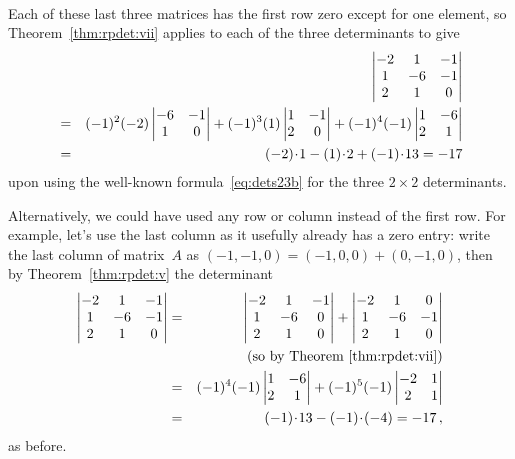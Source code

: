 \begin{example}
\begin{solution}
\begin{eqnarray*}
\end{eqnarray*}
Each of these last three matrices has the first row zero except for one element, so Theorem~\ref{thm:rpdet:vii} applies to each of the three determinants to give
\begin{eqnarray*}&&\hspace{-1em}
\begin{vmatrix}   -2&1&-1
\\   1 & -6 & -1
\\   2 &  1 & 0
\end{vmatrix}
\\&=&(-1)^2(-2)\begin{vmatrix}    -6 & -1
\\  1 & 0
\end{vmatrix}
+(-1)^3(1)\begin{vmatrix}    1 &  -1
\\   2 &  0
\end{vmatrix}
+(-1)^4(-1)\begin{vmatrix}   1 & -6 
\\   2 &  1 
\end{vmatrix}
\\&=&(-2)\cdot1-(1)\cdot2+(-1)\cdot13=-17
\end{eqnarray*}
upon using the well-known formula~\eqref{eq:dets23b} for the three \(2\times 2\) determinants.

Alternatively, we could have used any row or column instead of the first row.  
For example, let's use the last column as it usefully already has a zero entry: write the last column of matrix~\(A\) as \((-1,-1,0)=(-1,0,0)+(0,-1,0)\), then by Theorem~\ref{thm:rpdet:v} the determinant
\begin{eqnarray*}
\begin{vmatrix}   -2&1&-1
\\   1 & -6 & -1
\\   2 &  1 & 0
\end{vmatrix}
&=&\begin{vmatrix}   -2&1&-1
\\   1 & -6 & 0
\\   2 &  1 & 0
\end{vmatrix}
+\begin{vmatrix}   -2&1&0
\\   1 & -6 & -1
\\   2 &  1 & 0
\end{vmatrix}
\\&&\quad(\text{so by Theorem~\ref{thm:rpdet:vii}})
\\&=&(-1)^4(-1)\begin{vmatrix}
  1 & -6 
\\   2 &  1 
\end{vmatrix}
+(-1)^5(-1)\begin{vmatrix}   -2&1
\\   2 &  1 
\end{vmatrix}
\\&=&(-1)\cdot 13-(-1)\cdot(-4)=-17\,,
\end{eqnarray*}
as before.
\end{solution}
\end{example}
